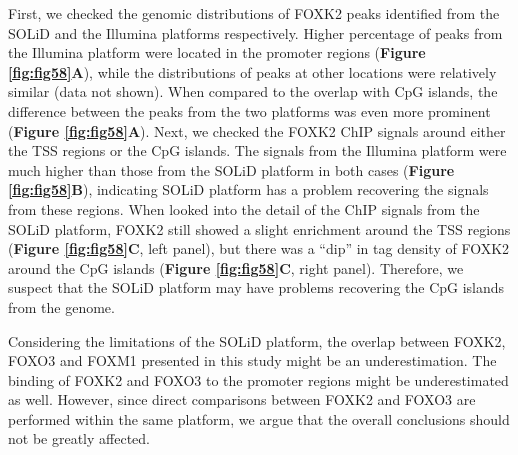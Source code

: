 First, we checked the genomic distributions of FOXK2 peaks identified from the SOLiD and the Illumina platforms respectively. Higher percentage of peaks from the Illumina platform were located in the promoter regions (\textbf{Figure \ref{fig:fig58}A}), while the distributions of peaks at other locations were relatively similar (data not shown). When compared to the overlap with CpG islands, the difference between the peaks from the two platforms was even more prominent (\textbf{Figure \ref{fig:fig58}A}). Next, we checked the FOXK2 ChIP signals around either the TSS regions or the CpG islands. The signals from the Illumina platform were much higher than those from the SOLiD platform in both cases (\textbf{Figure \ref{fig:fig58}B}), indicating SOLiD platform has a problem recovering the signals from these regions. When looked into the detail of the ChIP signals from the SOLiD platform, FOXK2 still showed a slight enrichment around the TSS regions (\textbf{Figure \ref{fig:fig58}C}, left panel), but there was a \enquote{dip} in tag density of FOXK2 around the CpG islands (\textbf{Figure \ref{fig:fig58}C}, right panel). Therefore, we suspect that the SOLiD platform may have problems recovering the CpG islands from the genome.

Considering the limitations of the SOLiD platform, the overlap between FOXK2, FOXO3 and FOXM1 presented in this study might be an underestimation. The binding of FOXK2 and FOXO3 to the promoter regions might be underestimated as well. However, since direct comparisons between FOXK2 and FOXO3 are performed within the same platform, we argue that the overall conclusions should not be greatly affected.